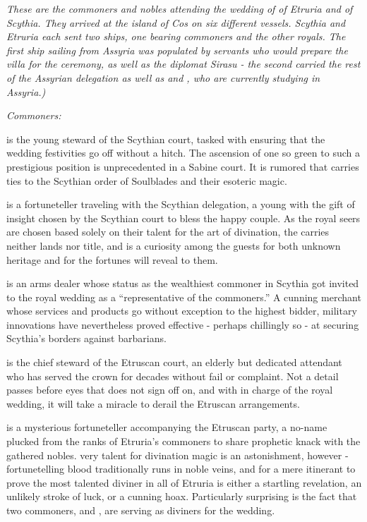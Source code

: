 \documentclass[blue]{Kos}
\begin{document}
\name{\bWhosWho{}}

\emph{These are the commoners and nobles attending the wedding of \cGroom{\Prince} \cGroom{} of Etruria and \cBride{\Prince} \cBride{} of Scythia. They arrived at the island of Cos on six different vessels. Scythia and Etruria each sent two ships, one bearing commoners and the other royals. The first ship sailing from Assyria was populated by servants who would prepare the villa for the ceremony, as well as the diplomat Sirasu - the second carried the rest of the Assyrian delegation as well as \cWard{} and \cPoet{}, who are currently studying in Assyria.)}

\emph{Commoners:}

\cButler{} is the young steward of the Scythian court, tasked with ensuring that the wedding festivities go off without a hitch. The ascension of one so green to such a prestigious position is unprecedented in a Sabine court. It is rumored that \cButler{\they} carries ties to the Scythian order of Soulblades and their esoteric magic.

\cBurglar{} is a fortuneteller traveling with the Scythian delegation, a young \cBurglar{\human} with the gift of insight chosen by the Scythian court to bless the happy couple. As the royal seers are chosen based solely on their talent for the art of divination, the \cBurglar{\human} carries neither lands nor title, and \cBurglar{\they} is a curiosity among the guests for both \cBurglar{\their} unknown heritage and for the fortunes \cBurglar{\they} will reveal to them.

\cArmsDealer{} is an arms dealer whose status as the wealthiest commoner in Scythia got \cArmsDealer{\them} invited to the royal wedding as a ``representative of the commoners.'' A cunning merchant whose services and products go without exception to the highest bidder, \cArmsDealer{\their} military innovations have nevertheless proved effective - perhaps chillingly so - at securing Scythia's borders against barbarians.

\cAssassin{} is the chief steward of the Etruscan court, an elderly but dedicated attendant who has served the crown for decades without fail or complaint. Not a detail passes before \cAssassin{\their} eyes that \cAssassin{\they} does not sign off on, and with \cAssassin{\them} in charge of the royal wedding, it will take a miracle to derail the Etruscan arrangements.

\cFugitive{} is a mysterious fortuneteller accompanying the Etruscan party, a no-name plucked from the ranks of Etruria's commoners to share \cFugitive{\their} prophetic knack with the gathered nobles. \cFugitive{\Their} very talent for divination magic is an astonishment, however - fortunetelling blood traditionally runs in noble veins, and for a mere itinerant to prove the most talented diviner in all of Etruria is either a startling revelation, an unlikely stroke of luck, or a cunning hoax. Particularly surprising is the fact that two commoners, \cFugitive{} and \cBurglar{}, are serving as diviners for the wedding.
\end{document}
